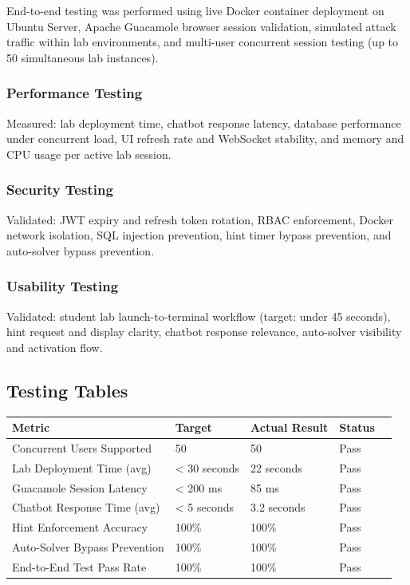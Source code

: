 \documentclass[12pt,a4paper]{report}
\newcommand{\hrow}{}
\newcommand{\hcell}[1]{\textbf{#1}}
\newcommand{\altrow}{}
\begin{document}
End-to-end testing was performed using live Docker container deployment on Ubuntu Server, Apache
Guacamole browser session validation, simulated attack traffic within lab environments, and
multi-user concurrent session testing (up to 50 simultaneous lab instances).

\subsubsection{Performance Testing}

Measured: lab deployment time, chatbot response latency, database performance under concurrent load,
UI refresh rate and WebSocket stability, and memory and CPU usage per active lab session.

\subsubsection{Security Testing}

Validated: JWT expiry and refresh token rotation, RBAC enforcement, Docker network isolation, SQL
injection prevention, hint timer bypass prevention, and auto-solver bypass prevention.

\subsubsection{Usability Testing}

Validated: student lab launch-to-terminal workflow (target: under 45 seconds), hint request and
display clarity, chatbot response relevance, auto-solver visibility and activation flow.

\subsection{Testing Tables}

\begin{center}
\begin{tabular}{|L{3.8cm}|L{2.8cm}|L{2.8cm}|L{2.8cm}|L{2cm}|}
\hline
\hrow \hcell{Metric} & \hcell{Target} & \hcell{Actual Result} & \hcell{Status} \\
\hline
Concurrent Users Supported & 50 & 50 & Pass \\\hline
\altrow Lab Deployment Time (avg) & < 30 seconds & 22 seconds & Pass \\\hline
Guacamole Session Latency & < 200 ms & 85 ms & Pass \\\hline
\altrow Chatbot Response Time (avg) & < 5 seconds & 3.2 seconds & Pass \\\hline
Hint Enforcement Accuracy & 100\% & 100\% & Pass \\\hline
\altrow Auto-Solver Bypass Prevention & 100\% & 100\% & Pass \\\hline
End-to-End Test Pass Rate & 100\% & 100\% & Pass \\\hline
\end{tabular}
\label{tab:perf}
\end{center}
\end{document}
